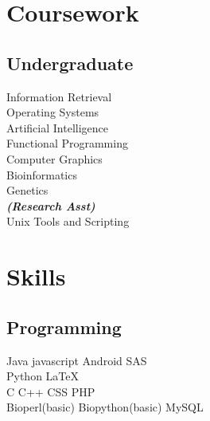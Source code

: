\documentclass[]{deedy-resume-openfont}
\begin{document}
\begin{minipage}[t]{0.33\textwidth}

\section{Coursework}

\subsection{Undergraduate}
Information Retrieval \\
Operating Systems \\
Artificial Intelligence \\
Functional Programming \\
Computer Graphics  \\
Bioinformatics \\ 
Genetics \\

{\footnotesize \textit{\textbf{(Research Asst) }}} \\
Unix Tools and Scripting \\
\sectionsep


\section{Skills}
\subsection{Programming}
Java \textbullet{}   javascript \textbullet{} Android \textbullet{} SAS  \\
 \textbullet{} Python \textbullet{}  \textbullet{} \LaTeX\ \\ 
C \textbullet{} C++ \textbullet{} CSS \textbullet{} PHP \textbullet{}  \\
 Bioperl(basic)\textbullet{} Biopython(basic) \textbullet{}  \textbullet{} MySQL
\sectionsep

%
%

\end{minipage} 
\hfill
\end{document}
